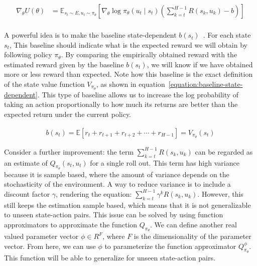 \documentclass{../main.tex}{subfiles}
\begin{document}
\begin{equation}\label{equation:utility-gradient-baseline-temporal}
\begin{aligned}
\nabla_{\theta} U(\theta) & = \mathbb{E}_{s_t \sim E, u_t \sim \pi_{\theta}} [\nabla_{\theta} \log \pi_{\theta}(u_t \mid s_t) (\sum_{k=t}^{H-1}R(s_k, u_k) - b)] \\
\end{aligned}
\end{equation}

A powerful idea is to make the baseline state-dependent $b(s_t)$~\citep{Baxter2001}. For each state $s_t$, This baseline should indicate what is the expected reward we will obtain by following policy $\pi_{\theta}$. By comparing the empirically obtained reward with the estimated reward given by the baseline $b(s_t)$, we will know if we have obtained more or less reward than expected. Note how this baseline is the exact definition of the state value function $V_{\pi_{\theta}}$, as shown in equation~\ref{equation:baseline-state-dependent}. This type of baseline allows us to increase the log probability of taking an action proportionally to how much its returns are better than the expected return under the current policy.

\begin{equation}\label{equation:baseline-state-dependent}
\begin{aligned}
b(s_t) = \mathbb{E}[r_t + r_{t+1} + r_{t+2} + \cdots + r_{H-1}] = V_{\pi_{\theta}}(s_t)
\end{aligned}
\end{equation}

Consider a further improvement: the term $\sum_{k=t}^{H-1}R(s_k, u_k)$ can be regarded as an estimate of $Q_{\pi_{\theta}}(s_t, u_t)$ for a single roll out. This term has high variance because it is sample based, where the amount of variance depends on the stochasticity of the environment. A way to reduce variance is to include a discount factor $\gamma$, rendering the equation: $\sum_{k=t}^{H-1} \gamma^k  R(s_k, u_k)$. However, this still keeps the estimation sample based, which means that it is not generalizable to unseen state-action pairs. This issue can be solved by using function approximators to approximate the function $Q_{\pi_{\theta}}$. We can define another real valued parameter vector $\phi \in R^F$, where $F$ is the dimensionality of the parameter vector. From here, we can use $\phi$ to parameterize the function approximator $Q^{\phi}_{\pi_{\theta}}$. This function will be able to generalize for unseen state-action pairs. 
\end{document}
